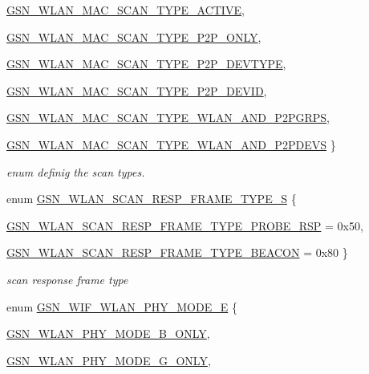 \begin{DoxyCompactItemize}
\par
\hyperlink{a00641_gga52dec04a012aa9893ac84e96062c470ba0a2c019c8d7d286adeef4d155fdd290d}{GSN\_\-WLAN\_\-MAC\_\-SCAN\_\-TYPE\_\-ACTIVE}, 
\par
\hyperlink{a00641_gga52dec04a012aa9893ac84e96062c470bac927d28ebd0a87f1039ffad73c3915af}{GSN\_\-WLAN\_\-MAC\_\-SCAN\_\-TYPE\_\-P2P\_\-ONLY}, 
\par
\hyperlink{a00641_gga52dec04a012aa9893ac84e96062c470bab745f3653e21ca78e739e1a6d353c3cb}{GSN\_\-WLAN\_\-MAC\_\-SCAN\_\-TYPE\_\-P2P\_\-DEVTYPE}, 
\par
\hyperlink{a00641_gga52dec04a012aa9893ac84e96062c470ba8b4ffffa89d273529027dd15468a235a}{GSN\_\-WLAN\_\-MAC\_\-SCAN\_\-TYPE\_\-P2P\_\-DEVID}, 
\par
\hyperlink{a00641_gga52dec04a012aa9893ac84e96062c470ba546c8c8247779348d500fa7251e8e86f}{GSN\_\-WLAN\_\-MAC\_\-SCAN\_\-TYPE\_\-WLAN\_\-AND\_\-P2PGRPS}, 
\par
\hyperlink{a00641_gga52dec04a012aa9893ac84e96062c470ba3257c6240a97ccd25ac86623647bfa7f}{GSN\_\-WLAN\_\-MAC\_\-SCAN\_\-TYPE\_\-WLAN\_\-AND\_\-P2PDEVS}
 \}
\begin{DoxyCompactList}\small\item\em enum definig the scan types. \end{DoxyCompactList}\item 
enum \hyperlink{a00641_ga3f0acfab3987e81164e864f7186c7187}{GSN\_\-WLAN\_\-SCAN\_\-RESP\_\-FRAME\_\-TYPE\_\-S} \{ \par
\hyperlink{a00641_gga3f0acfab3987e81164e864f7186c7187a770294a815837fe9c2dc6bde4b3d4dd2}{GSN\_\-WLAN\_\-SCAN\_\-RESP\_\-FRAME\_\-TYPE\_\-PROBE\_\-RSP} =  0x50, 
\par
\hyperlink{a00641_gga3f0acfab3987e81164e864f7186c7187a367086e0b187f766c247e036f4791cac}{GSN\_\-WLAN\_\-SCAN\_\-RESP\_\-FRAME\_\-TYPE\_\-BEACON} =  0x80
 \}
\begin{DoxyCompactList}\small\item\em scan response frame type \end{DoxyCompactList}\item 
enum \hyperlink{a00641_ga9150700f5a8033a0c34dba0d69e2ff38}{GSN\_\-WIF\_\-WLAN\_\-PHY\_\-MODE\_\-E} \{ \par
\hyperlink{a00641_ga9150700f5a8033a0c34dba0d69e2ff38a9258d0f7cded17bc5ab41dd8257f3700}{GSN\_\-WLAN\_\-PHY\_\-MODE\_\-B\_\-ONLY}, 
\par
\hyperlink{a00641_ga9150700f5a8033a0c34dba0d69e2ff38a1a7b120674a9ec20783b762dedc89a88}{GSN\_\-WLAN\_\-PHY\_\-MODE\_\-G\_\-ONLY}, 

\end{DoxyCompactItemize}
